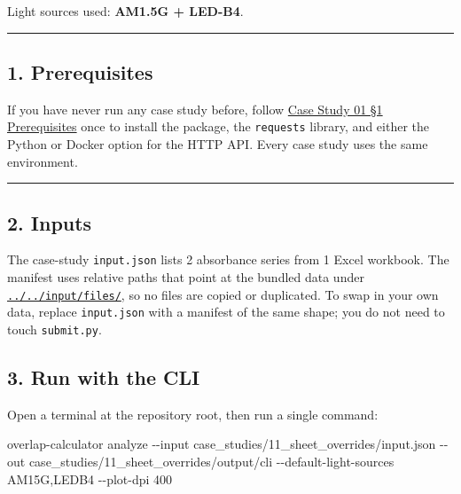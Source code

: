 \documentclass[
  11pt,
]{article}
\newenvironment{Shaded}{}{}
\newcommand{\AttributeTok}[1]{\textcolor[rgb]{0.49,0.56,0.16}{#1}}
\newcommand{\ExtensionTok}[1]{#1}
\newcommand{\NormalTok}[1]{#1}
\begin{document}
Light sources used: \textbf{AM1.5G + LED-B4}.

\begin{center}\rule{0.5\linewidth}{0.5pt}\end{center}

\hypertarget{1-prerequisites}{
\subsection{1. Prerequisites}\label{1-prerequisites}}

If you have never run any case study before, follow
\href{https://github.com/pinarsyt/overlap-calculator/blob/main/case_studies/01_theoretical_only/README.md\#1-prerequisites}{Case
Study 01 §1 Prerequisites} once to install the package, the
\texttt{requests} library, and either the Python or Docker option for
the HTTP API. Every case study uses the same environment.

\begin{center}\rule{0.5\linewidth}{0.5pt}\end{center}

\hypertarget{2-inputs}{
\subsection{2. Inputs}\label{2-inputs}}

The case-study \texttt{input.json} lists 2 absorbance series from 1
Excel workbook. The manifest uses relative paths that point at the
bundled data under
\href{https://github.com/pinarsyt/overlap-calculator/blob/main/input/files}{\texttt{../../input/files/}},
so no files are copied or duplicated. To swap in your own data, replace
\texttt{input.json} with a manifest of the same shape; you do not need
to touch \texttt{submit.py}.

\hypertarget{3-run-with-the-cli}{
\subsection{3. Run with the CLI}\label{3-run-with-the-cli}}

Open a terminal at the repository root, then run a single command:

\begin{Shaded}
\begin{Highlighting}[]
\ExtensionTok{overlap{-}calculator}\NormalTok{ analyze }\AttributeTok{{-}{-}input}\NormalTok{ case\_studies/11\_sheet\_overrides/input.json }\AttributeTok{{-}{-}out}\NormalTok{ case\_studies/11\_sheet\_overrides/output/cli }\AttributeTok{{-}{-}default{-}light{-}sources}\NormalTok{ AM15G,LEDB4 }\AttributeTok{{-}{-}plot{-}dpi}\NormalTok{ 400}
\end{Highlighting}
\end{Shaded}
\end{document}
